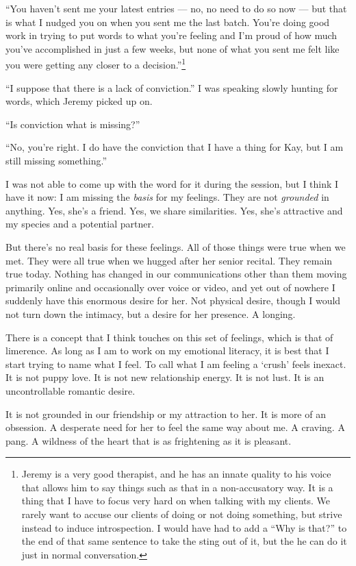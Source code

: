 ``You haven't sent me your latest entries --- no, no need to do so now --- but that is what I nudged you on when you sent me the last batch. You're doing good work in trying to put words to what you're feeling and I'm proud of how much you've accomplished in just a few weeks, but none of what you sent me felt like you were getting any closer to a decision.''\footnote{Jeremy is a very good therapist, and he has an innate quality to his voice that allows him to say things such as that in a non-accusatory way. It is a thing that I have to focus very hard on when talking with my clients. We rarely want to accuse our clients of doing or not doing something, but strive instead to induce introspection. I would have had to add a ``Why is that?'' to the end of that same sentence to take the sting out of it, but the he can do it just in normal conversation.}

``I suppose that there is a lack of conviction.'' I was speaking slowly hunting for words, which Jeremy picked up on.

``Is conviction what is missing?''

``No, you're right. I do have the conviction that I have a thing for Kay, but I am still missing something.''

I was not able to come up with the word for it during the session, but I think I have it now: I am missing the \emph{basis} for my feelings. They are not \emph{grounded} in anything. Yes, she's a friend. Yes, we share similarities. Yes, she's attractive and my species and a potential partner.

But there's no real basis for these feelings. All of those things were true when we met. They were all true when we hugged after her senior recital. They remain true today. Nothing has changed in our communications other than them moving primarily online and occasionally over voice or video, and yet out of nowhere I suddenly have this enormous desire for her. Not physical desire, though I would not turn down the intimacy, but a desire for her presence. A longing.

There is a concept that I think touches on this set of feelings, which is that of limerence. As long as I am to work on my emotional literacy, it is best that I start trying to name what I feel. To call what I am feeling a `crush' feels inexact. It is not puppy love. It is not new relationship energy. It is not lust. It is an uncontrollable romantic desire.

It is not grounded in our friendship or my attraction to her. It is more of an obsession. A desperate need for her to feel the same way about me. A craving. A pang. A wildness of the heart that is as frightening as it is pleasant.

